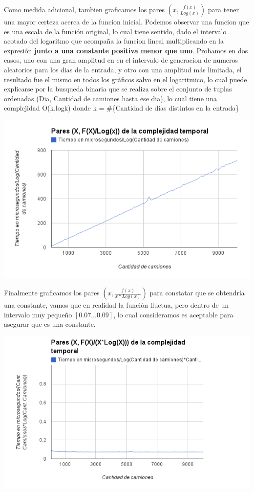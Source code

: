 Como medida adicional, tambien graficamos los pares $(x, \frac{f(x)}{Log(x)})$ para tener una mayor certeza acerca de la funcion inicial. Podemos observar una funcion que es una escala de la funci\'on original, lo cual tiene sentido, dado el intervalo acotado del logaritmo que acompa\~na la funcion lineal multiplicando en la expresi\'on  \textbf{junto a una constante positiva menor que uno}. Probamos en dos casos, uno con una gran amplitud en en el intervalo de generacion de numeros aleatorios para los dias de la entrada, y otro con una amplitud m\'as limitada, el resultado fue el mismo en todos los gr\'aficos salvo en el logaritmico, lo cual puede explicarse por la busqueda binaria que se realiza sobre el conjunto de tuplas ordenadas (Dia, Cantidad de camiones hasta ese dia), lo cual tiene una complejidad O(k.logk) donde k = \#\{Cantidad de dias distintos en la entrada\}
\begin{center}
	\includegraphics[scale=0.6]{images/ej1_fx_logx.png}
\end{center}

Finalmente graficamos los pares $(x, \frac{f(x)}{x*Log(x)})$ para constatar que se obtendr\'ia una constante, vamos que en realidad la funci\'on fluctua, pero dentro de un intervalo muy peque\~no $\left[ 0.07 \dots 0.09\right]$, lo cual consideramos es aceptable para asegurar que es una constante.

\begin{center}
	\includegraphics[scale=0.6]{images/ej1_fx_xlogx.png}
\end{center}

